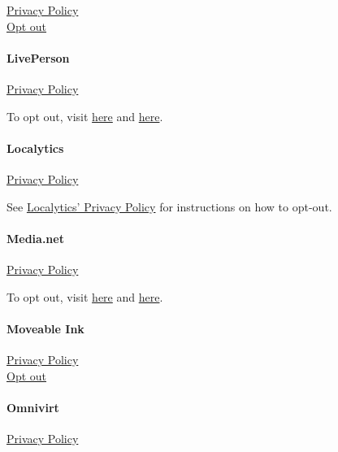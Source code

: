 \href{https://www.liveintent.com/services-privacy-policy/}{Privacy
Policy}\\
\href{https://optout.aboutads.info/?c=2\&lang=EN}{Opt out}

\hypertarget{liveperson}{%
\paragraph{LivePerson}\label{liveperson}}

\href{https://www.liveperson.com/policies/privacy/}{Privacy Policy}

To opt out, visit
\href{https://www.allaboutcookies.org/manage-cookies/}{here} and
\href{https://www.youronlinechoices.com/}{here}.

\hypertarget{localytics}{%
\paragraph{Localytics}\label{localytics}}

\href{https://www.localytics.com/privacy-policy/}{Privacy Policy}

See \href{https://www.localytics.com/privacy-policy/}{Localytics'
Privacy Policy} for instructions on how to opt-out.

\hypertarget{medianet}{%
\paragraph{Media.net}\label{medianet}}

\href{https://www.media.net/privacy-policy/}{Privacy Policy}

To opt out, visit
\href{http://www.networkadvertising.org/choices/}{here} and
\href{http://www.networkadvertising.org/mobile-choice}{here}.

\hypertarget{moveable-ink}{%
\paragraph{Moveable Ink}\label{moveable-ink}}

\href{https://movableink.com/legal/privacy}{Privacy Policy}\\
\href{http://optout.aboutads.info/?c=2\&lang=EN}{Opt out}

\hypertarget{omnivirt}{%
\paragraph{Omnivirt}\label{omnivirt}}

\href{https://www.omnivirt.com/tos/privacy/}{Privacy Policy}

